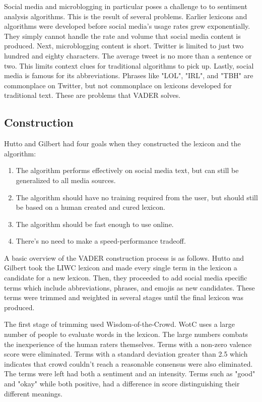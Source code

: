 \documentclass[11pt, twoside, reqno]{book}
\begin{document}
Social media and microblogging in particular poses a challenge to to sentiment analysis algorithms. This is the result of several problems. Earlier lexicons and algorithms were developed before social media's usage rates grew exponentially. They simply cannot handle the rate and volume that social media content is produced. Next, microblogging content is short. Twitter is limited to just two hundred and eighty characters. The average tweet is no more than a sentence or two. This limits context clues for traditional algorithms to pick up. Lastly, social media is famous for its abbreviations. Phrases like "LOL", "IRL", and "TBH" are commonplace on Twitter, but not commonplace on lexicons developed for traditional text. These are problems that VADER solves.

\subsection{Construction}
\hspace{0.2in}Hutto and Gilbert had four goals when they constructed the lexicon and the algorithm:
\begin{enumerate}
	\item The algorithm performs effectively on social media text, but can still be generalized to all media sources. 
	\item The algorithm should have no training required from the user, but should still be based on a human created and cured lexicon. 
	\item The algorithm should be fast enough to use online.
	\item There's no need to make a speed-performance tradeoff. 
\end{enumerate}

A basic overview of the VADER construction process is as follows. Hutto and Gilbert took the LIWC lexicon and made every single term in the lexicon a candidate for a new lexicon. Then, they proceeded to add social media specific terms which include abbreviations, phrases, and emojis as new candidates. These terms were trimmed and weighted in several stages until the final lexicon was produced. 

The first stage of trimming used Wisdom-of-the-Crowd. WotC uses a large number of people to evaluate words in the lexicon. The large numbers combats the inexperience of the human raters themselves. Terms with a non-zero valence score were eliminated. Terms with a standard deviation greater than 2.5 which indicates that crowd couldn't reach a reasonable consensus were also eliminated. The terms were left had both a sentiment and an intensity. Terms such as "good" and "okay" while both positive, had a difference in score distinguishing their different meanings. 
\end{document}
